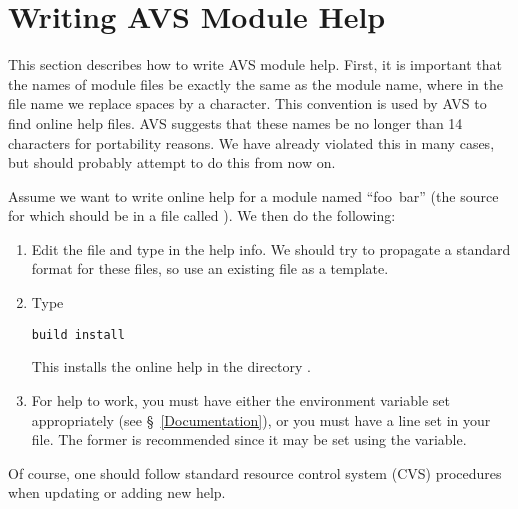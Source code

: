 
\section{Writing AVS Module Help}
\label{Writing AVS Module Help}

This section describes how to write AVS module help.
First, it is important that the names of module files be exactly the
same as the module name, where in the file name we replace spaces by
a \code{_} character.
This convention is used by AVS to find online help files.
AVS suggests that these names be no longer than 14 characters
for portability reasons.
We have already violated this in many cases, but should probably
attempt to do this from now on.

Assume we want to write online help for a module named ``foo~bar''
(the source for which should be in a file called ).
We then do the following:
\begin{enumerate}

\item
Edit the file  and type in the help info.
We should try to propagate a standard format for these files,
so use an existing file as a template.

\item
Type
\begin{display}\begin{verbatim}
build install
\end{verbatim}\end{display}
This installs the online help in the directory
.

\item
For help to work, you must have either the environment variable
 set appropriately (see \S~\ref{Documentation}),
or you must have a  line set in your  file.
The former is recommended since it may be set using the
 variable.

\end{enumerate}
Of course, one should follow standard resource control system (CVS)
procedures when updating or adding new help.



